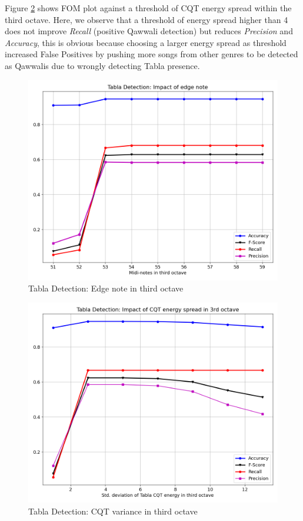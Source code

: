 \documentclass{article}
\begin{document}
Figure \ref{fig:src_o3} shows FOM plot against a threshold of CQT energy spread within the third octave. Here, we observe that a threshold of energy spread higher than 4 does not improve \textit{Recall} (positive Qawwali detection) but reduces \textit{Precision} and \textit{Accuracy}, this is obvious because choosing a larger energy spread as threshold increased False Positives by pushing more songs from other genres to be detected as Qawwalis due to wrongly detecting Tabla presence.
\begin{figure}[htbp]
  \centering
  \includegraphics[scale=1.0, width=0.95\columnwidth]{edge}
  \caption{Tabla Detection: Edge note in third octave}
\label{fig:src_edge}
\end{figure}
\begin{figure}[htbp]
  \centering
  \includegraphics[scale=0.75, width=0.95\columnwidth]{o3}
  \caption{Tabla Detection: CQT variance in third octave}
\label{fig:src_o3}
\end{figure}
\end{document}
